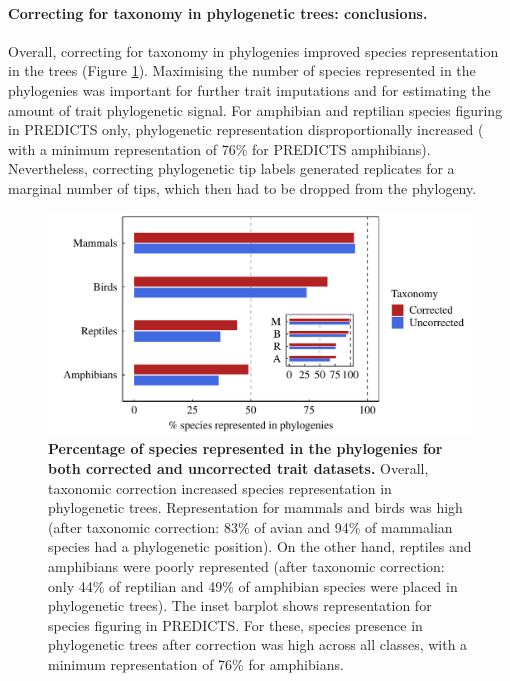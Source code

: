 \paragraph{Correcting for taxonomy in phylogenetic trees: conclusions.}
Overall, correcting for taxonomy in phylogenies improved species representation in the trees (Figure \ref{species_rep_phylo}). Maximising the number of species represented in the phylogenies was important for further trait imputations and for estimating the amount of trait phylogenetic signal. For amphibian and reptilian species figuring in PREDICTS only, phylogenetic representation disproportionally increased ( with a minimum representation of 76\% for PREDICTS amphibians). Nevertheless, correcting phylogenetic tip labels generated replicates for a marginal number of tips, which then had to be dropped from the phylogeny. 

\begin{figure}[h!]
\centering
\includegraphics[scale=0.7]{figures/chapter2/Species_representation_phylo}
\caption[Percentage of species represented in the phylogenies for both corrected and uncorrected trait datasets]{\textbf{Percentage of species represented in the phylogenies for both corrected and uncorrected trait datasets.} Overall, taxonomic correction increased species representation in phylogenetic trees. Representation for mammals and birds was high (after taxonomic correction: 83\% of avian and 94\% of mammalian species had a phylogenetic position). On the other hand, reptiles and amphibians were poorly represented (after taxonomic correction: only 44\% of reptilian and 49\% of amphibian species were placed in phylogenetic trees). The inset barplot shows representation for species figuring in PREDICTS. For these, species presence in phylogenetic trees after correction was high across all classes, with a minimum representation of 76\% for amphibians.}
\label{species_rep_phylo}
\end{figure}


